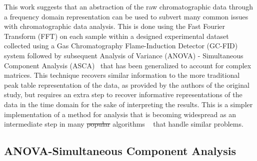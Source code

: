 \documentclass[preprint,12pt]{elsarticle}
\providecommand{\DIFadd}[1]{{\protect\color{blue}\uwave{#1}}} %
\providecommand{\DIFdel}[1]{{\protect\color{red}\sout{#1}}}                      %
\providecommand{\DIFaddbegin}{} %
\providecommand{\DIFaddend}{} %
\providecommand{\DIFdelbegin}{} %
\providecommand{\DIFdelend}{} %
\begin{document}
\DIFdelbegin %


\DIFdelend This work suggests that an abstraction of the raw chromatographic data through a frequency domain representation can be used to subvert many common issues with chromatographic data analysis. This is done using the Fast Fourier Transform (FFT) on each sample within a designed experimental dataset collected using a Gas Chromatography Flame-Induction Detector (GC-FID) system followed by subsequent Analysis of Variance (ANOVA) - Simultaneous Component Analysis (ASCA)~\cite{smilde2005anova} that has been generalized to account for complex matrices. This technique recovers similar information to the more traditional peak table representation of the data, as provided by the authors of the original study, but requires an extra step to recover informative representations of the data in the time domain for the sake of interpreting the results. This is a simpler implementation of a method for analysis that is becoming widespread as an intermediate step in many \DIFdelbegin \DIFdel{popular }\DIFdelend \DIFaddbegin \DIFadd{newer }\DIFaddend algorithms ~\cite{schneide2023shift,schneide2024shift,yu2023parasias} that handle similar problems.


\subsection{ANOVA-Simultaneous Component Analysis}\DIFaddbegin \label{sec:glm}
\DIFaddend 
\end{document}
